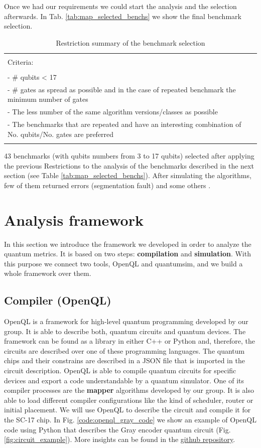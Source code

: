 Once we had our requirements we could start the analysis and the selection afterwards.
In Tab. \ref{tab:map_selected_benchs} we show the final benchmark selection.
\begin{table}[htbp]
\caption{\label{tab:org0f8ca31}
Restriction summary of the benchmark selection}
\centering
\begin{tabular}{|l|}
\hline
\\
Criteria:\\
\\
- \# qubits < 17\\
- \# gates as spread as possible and in the case of repeated benchmark the minimum number of gates\\
- The less number of the same algorithm versions/classes as possible\\
- The benchmarks that are repeated and have an interesting combination of No. qubits/No. gates are  preferred\\
\\
\hline
\end{tabular}
\end{table}
43 benchmarks (with qubits numbers from 3 to 17 qubits) selected after applying the previous Restrictions to the analysis of the benchmarks described in the next section (see Table \ref{tab:map_selected_benchs}).
After simulating the algorithms, few of them returned errors (segmentation fault) and some others .

\section{Analysis framework}
\label{sec:orgc0c805b}
In this section we introduce the framework we developed in order to analyze the quantum metrics.
It is based on two steps: \textbf{compilation} and \textbf{simulation}.
With this purpose we connect two tools, OpenQL and quantumsim, and we build a whole framework over them.

\subsection{Compiler (OpenQL)}
\label{sec:orgeebd0c8}
OpenQL is a framework for high-level quantum programming developed by our group.
It is able to describe both, quantum circuits and quantum devices.
The framework can be found as a library in either C++ or Python and, therefore, the circuits are described over one of these programming languages.
The quantum chips and their constrains are described in a JSON file that is imported in the circuit description.
OpenQL is able to compile quantum circuits for specific devices and export a code understandable by a quantum simulator.
One of its compiler processes are the \textbf{mapper} algorithms developed by our group.
It is also able to load different compiler configurations like the kind of scheduler, router or initial placement.
We will use OpenQL to describe the circuit and compile it for the SC-17 chip.
In Fig. \ref{code:openql_gray_code} we show an example of OpenQL code using Python that describes the Gray encoder quantum circuit (Fig. \ref{fig:circuit_example}).
More insights can be found in the \href{https://github.com/QE-Lab/OpenQL}{github repository}.

